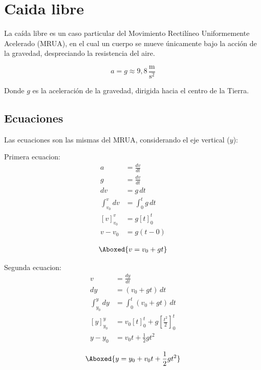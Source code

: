 \section{Caida libre}

La caída libre es un caso particular del Movimiento Rectilíneo Uniformemente Acelerado (MRUA), en el cual un cuerpo se mueve únicamente bajo la acción de la gravedad, despreciando la resistencia del aire.

\vspace{-20pt}

\[
a = g \approx 9{,}8 \,\frac{\text{m}}{\text{s}^2}
\]

Donde $g$ es la aceleración de la gravedad, dirigida hacia el centro de la Tierra.


\subsection{Ecuaciones}

Las ecuaciones son las mismas del MRUA, considerando el eje vertical ($y$):

Primera ecuacion:
\begin{align*}
a &= \frac{dv}{dt} \\
g &= \frac{dv}{dt} \\
dv &= g\,dt \\
\int_{v_0}^{v} dv &= \int_{0}^{t} g\,dt \\
\left[v\right]_{v_0}^{v} &= g\left[t\right]_{0}^{t} \\
v - v_0 &= g(t - 0)
\end{align*}

\vspace{-30pt}

\begin{align*}
    \Aboxed{v = v_0 + gt}
\end{align*}

Segunda ecuacion:
\begin{align*}
v &= \frac{dy}{dt} \\
dy &= (v_0 + gt)\,dt \\
\int_{y_0}^{y} dy &= \int_{0}^{t} (v_0 + gt)\,dt \\
\left[y\right]_{y_0}^{y} &= v_0\left[t\right]_{0}^{t} + g\left[\frac{t^2}{2}\right]_{0}^{t} \\
y - y_0 &= v_0 t + \frac{1}{2}gt^2
\end{align*}

\vspace{-20pt}

\begin{align*}
    \Aboxed{y = y_0 + v_0 t + \frac{1}{2}gt^2}
\end{align*}

